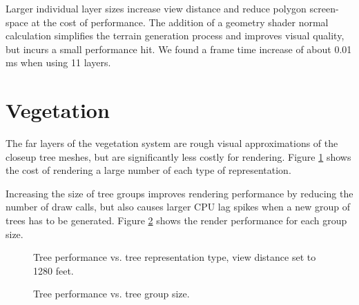Larger individual layer sizes increase view distance and reduce polygon screen-space at the cost of performance.
The addition of a geometry shader normal calculation simplifies the terrain generation process and improves visual quality, but incurs a small performance hit.
We found a frame time increase of about 0.01 ms when using 11 layers.


\section{Vegetation} \label{sec:results_vegetation}

The far layers of the vegetation system are rough visual approximations of the closeup tree meshes, but are significantly less costly for rendering.
Figure \ref{fig:tree_plot_1} shows the cost of rendering a large number of each type of representation.

Increasing the size of tree groups improves rendering performance by reducing the number of draw calls, but also causes larger CPU lag spikes when a new group of trees has to be generated.
Figure \ref{fig:tree_plot_2} shows the render performance for each group size.

\begin{figure}
	\centering
{}
	\caption{
		Tree performance vs. tree representation type, view distance set to 1280 feet.
	}
	\label{fig:tree_plot_1}
\end{figure}

\begin{figure}
	\centering
{}
	\caption{
		Tree performance vs. tree group size.
	}
	\label{fig:tree_plot_2}
\end{figure}
